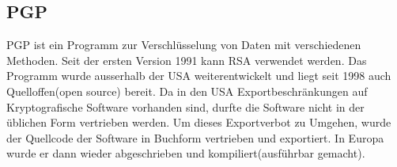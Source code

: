 \subsection{PGP}
PGP ist ein Programm zur Verschlüsselung von Daten mit verschiedenen Methoden. Seit der ersten Version 1991 kann RSA verwendet werden. Das Programm wurde ausserhalb der USA weiterentwickelt und liegt seit 1998 auch Quelloffen(open source) bereit. Da in den USA Exportbeschränkungen auf Kryptografische Software vorhanden sind, durfte die Software nicht in der üblichen Form vertrieben werden. Um dieses Exportverbot zu Umgehen, wurde der Quellcode der Software in Buchform vertrieben und exportiert. In Europa wurde er dann wieder abgeschrieben und kompiliert(ausführbar gemacht). 

